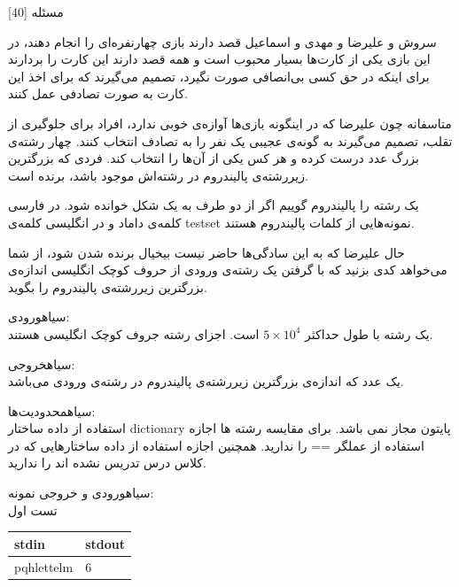 ‌مسئله [40]

سروش و علیرضا و مهدی و اسماعیل قصد دارند بازی چهارنفره‌ای را انجام دهند، در این بازی یکی از کارت‌ها بسیار محبوب است و همه قصد‌ دارند این کارت را بردارند برای اینکه در حق کسی بی‌انصافی صورت نگیرد، تصمیم می‌گیرند که برای اخذ این کارت به صورت تصادفی عمل کنند.

متاسفانه چون علیرضا که در اینگونه بازی‌ها آوازه‌ی خوبی ندارد، افراد برای جلوگیری از تقلب،‌ تصمیم می‌گیرند به گونه‌ی عجیبی یک نفر را به تصادف انتخاب کنند. چهار رشته‌ی بزرگ عدد درست کرده و هر کس یکی از آن‌ها را انتخاب کند. فردی که بزرگترین زیررشته‌ی پالیندروم در رشته‌اش موجود باشد، برنده است.

یک رشته را پالیندروم گوییم اگر از دو طرف به یک شکل خوانده شود. در فارسی کلمه‌ی داماد و در انگلیسی کلمه‌ی testset نمونه‌هایی از کلمات پالیندروم هستند.


حال علیرضا که به این سادگی‌ها حاضر نیست بیخیال برنده شدن شود، از شما می‌خواهد کدی بزنید که با گرفتن یک رشته‌ی ورودی از حروف کوچک انگلیسی اندازه‌ی بزرگترین زیررشته‌ی پالیندروم را بگوید.

‌سیاه{ورودی:}\\
یک رشته با طول حداکثر
$5 \times 10^4$
است. اجزای رشته جروف کوچک انگلیسی هستند.


‌سیاه{خروجی:}\\
یک عدد که اندازه‌ی بزرگترین زیررشته‌ی پالیندروم در رشته‌ی ورودی می‌باشد.


‌سیاه{محدودیت‌ها:}\\
استفاده از داده ساختار dictionary پایتون مجاز نمی باشد. برای مقایسه رشته ها اجازه استفاده از عملگر == را ندارید. همچنین اجازه استفاده از داده ساختارهایی که در کلاس درس تدریس نشده اند را ندارید.

‌سیاه{ورودی و خروجی نمونه:}\\

تست اول
\begin{latin}
	\begin{tabularx}{\textwidth}{|X | X|}
		\hline
		\textbf{stdin} &
		\textbf{stdout}\\
		\hline
		pqhlettelm & 6\\
		\hline
	\end{tabularx}
\end{latin}


